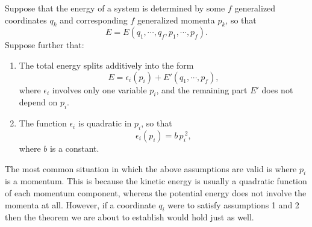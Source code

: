 Suppose that the energy of a
system is determined  by some $f$ generalized coordinates $q_k$
and corresponding $f$ generalized momenta $p_k$, so that
\begin{equation}
E = E(q_1, \cdots, q_f, p_1,\cdots, p_f).
\end{equation}
Suppose further that:
\begin{enumerate}
\item The total energy splits additively into the form
\begin{equation}
E = \epsilon_i(p_i) + E'(q_1,\cdots, p_f),
\end{equation}
where $\epsilon_i$ involves only one variable $p_i$, and the remaining part
$E'$ does not depend on $p_i$.
\item The function $\epsilon_i$ is quadratic in $p_i$, so that
\begin{equation}
\epsilon_i(p_i) = b\,p_i^{~2},
\end{equation}
where $b$ is a constant.
\end{enumerate}
The most common situation in which the above assumptions are valid is where 
$p_i$ is a momentum. This is because the kinetic energy is usually a quadratic
function of each momentum component, whereas the potential energy does not
involve the momenta at all. However, if a coordinate $q_i$ were to satisfy 
assumptions 1 and 2 then the theorem we are about to establish would hold just
as well.

